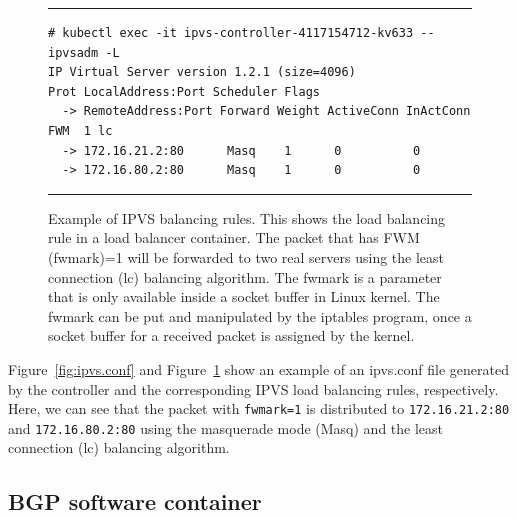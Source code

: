 \begin{figure}[h]
  \centering
  \rule{\columnwidth}{0.4pt}
\begin{verbatim}
# kubectl exec -it ipvs-controller-4117154712-kv633 -- ipvsadm -L
IP Virtual Server version 1.2.1 (size=4096)
Prot LocalAddress:Port Scheduler Flags
  -> RemoteAddress:Port Forward Weight ActiveConn InActConn
FWM  1 lc
  -> 172.16.21.2:80      Masq    1      0          0         
  -> 172.16.80.2:80      Masq    1      0          0
\end{verbatim}
\rule{\columnwidth}{0.4pt}

  \par\bigskip
  \centering
  \begin{minipage}{0.9\columnwidth}
    \caption[Example of IPVS balancing rules]{
      Example of IPVS balancing rules.
      This shows the load balancing rule in a load balancer container.
      The packet that has FWM (fwmark)=1 will be forwarded to two real servers using the least connection (lc) balancing algorithm.
      The fwmark is a parameter that is only available inside a socket buffer in Linux kernel.
      The fwmark can be put and manipulated by the iptables program, once a socket buffer for a received packet is assigned by the kernel.
      }
    \label{fig:IPVS rule}
  \end{minipage}
\end{figure}

Figure~\ref{fig:ipvs.conf} and Figure~\ref{fig:IPVS rule} show an example of an ipvs.conf file 
generated by the controller and the corresponding IPVS load balancing rules, respectively.
Here, we can see that the packet with {\tt fwmark=1} \cite{BertHubert2002} is distributed 
to {\tt 172.16.21.2:80} and {\tt 172.16.80.2:80} 
using the masquerade mode (Masq) and 
the least connection (lc) \cite{Zhang2000} balancing algorithm.

\subsection{BGP software container}\label{sec:bgp}

